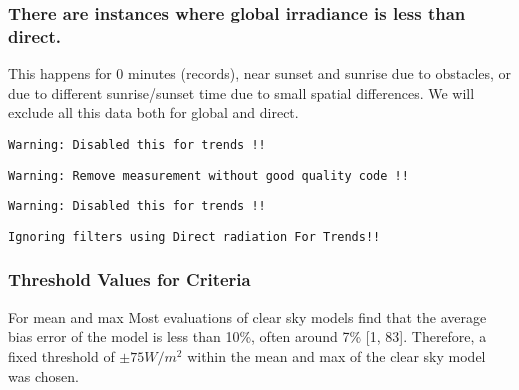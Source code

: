 \documentclass[
  10pt,
  a4paper,oneside]{article}
\begin{document}
\hypertarget{there-are-instances-where-global-irradiance-is-less-than-direct.}{%
\subsubsection{There are instances where global irradiance is less than direct.}\label{there-are-instances-where-global-irradiance-is-less-than-direct.}}

This happens for 0
minutes (records), near sunset and sunrise due to obstacles,
or due to different sunrise/sunset time due to small spatial differences.
We will exclude all this data both for global and direct.

\begin{verbatim}
Warning: Disabled this for trends !!
\end{verbatim}

\begin{verbatim}
Warning: Remove measurement without good quality code !!
\end{verbatim}

\begin{verbatim}
Warning: Disabled this for trends !!
\end{verbatim}

\begin{verbatim}
Ignoring filters using Direct radiation For Trends!!
\end{verbatim}

\hypertarget{threshold-values-for-criteria}{%
\subsubsection{Threshold Values for Criteria}\label{threshold-values-for-criteria}}

For mean and max Most evaluations of clear sky models find that the average
bias error of the model is less than 10\%, often around 7\% {[}1, 83{]}. Therefore,
a fixed threshold of \(\pm 75 W / m^2\) within the mean and max of the clear sky model
was chosen.
\end{document}
